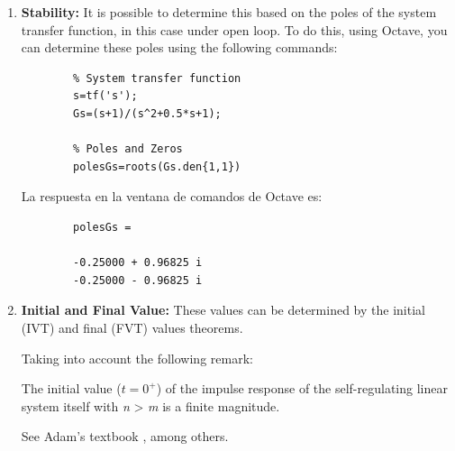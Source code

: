	\vspace{0.4cm}
	\begin{enumerate}
		\item \textbf{Stability:} It is possible to determine this based on the poles of the system transfer function, in this case under open loop. To do this, using Octave, you can determine these poles using the following commands:
		
		\vspace{0.4cm}
		
		\begin{verbatim}
		% System transfer function
		s=tf('s');
		Gs=(s+1)/(s^2+0.5*s+1);
		
		% Poles and Zeros
		polesGs=roots(Gs.den{1,1})
		\end{verbatim}
		
		\vspace{0.4cm}
		La respuesta en la ventana de comandos de Octave es:
		\begin{verbatim}
		polesGs =
		
		-0.25000 + 0.96825 i
		-0.25000 - 0.96825 i
		\end{verbatim}
		
		\item \textbf{Initial and Final Value:} These values can be determined by the initial (IVT) and final (FVT) values theorems.
		
		\vspace{0.4cm}
		Taking into account the following remark:
		
		\begin{remark}
			\begin{remarca}\label{rem01_chp_trans}
				The initial value ($t = 0^+$) of the impulse response of the self-regulating linear system itself with \textit{n} > \textit{m} is a finite magnitude.
			\end{remarca}
			
			\begin{demo}
				See Adam's textbook \cite{Adam2018}, among others.
			\end{demo}
		\end{remark}
	

\end{enumerate}
